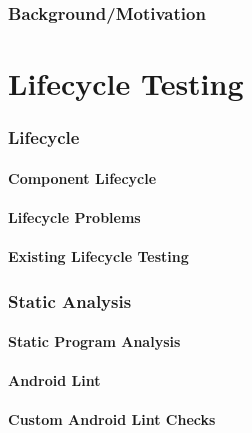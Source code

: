\documentclass[11pt,a4paper,notitlepage]{article}
\begin{document}
\section{Background/Motivation}




\part{Lifecycle Testing}


\section{Lifecycle}

\subsection{Component Lifecycle}

\subsection{Lifecycle Problems}

\subsection{Existing Lifecycle Testing}



\section{Static Analysis}

\subsection{Static Program Analysis}

\subsection{Android Lint}

\subsection{Custom Android Lint Checks}
\end{document}
